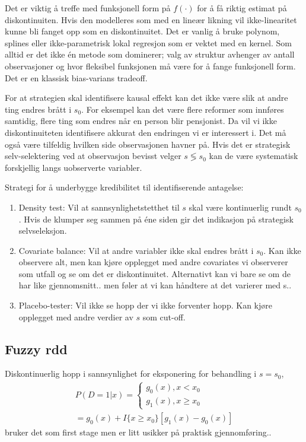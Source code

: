 Det er viktig å treffe med funksjonell form på $f(\cdot)$ for å få riktig estimat på diskontinuiten. Hvis den modelleres som med en lineær likning vil ikke-linearitet kunne bli fanget opp som en diskontinuitet. Det er vanlig å bruke polynom, splines eller ikke-parametrisk lokal regresjon som er vektet med en kernel. Som alltid er det ikke én metode som dominerer; valg av struktur avhenger av antall observasjoner og hvor fleksibel funksjonen må være for å fange funksjonell form. Det er en klassisk bias-varians tradeoff.  

For at strategien skal identifisere kausal effekt kan det ikke være slik at andre ting endres brått i $s_0$. For eksempel kan det være flere reformer som innføres samtidig, flere ting som endres når en person blir pensjonist. Da vil vi ikke diskontinuiteten identifisere akkurat den endringen vi er interessert i. Det må også være tilfeldig hvilken side observasjonen havner på. Hvis det er strategisk selv-selektering ved at observasjon bevisst velger $ s \lessgtr s_0$ kan de være systematisk forskjellig langs uobserverte variabler.

Strategi for å underbygge kredibilitet til identifiserende antagelse:
\begin{enumerate}
\item Density test: Vil at sannsynlighetstetthet til $s$ skal være kontinuerlig rundt $s_0$. Hvis de klumper seg sammen på éne siden gir det indikasjon på strategisk selvseleksjon.
\item Covariate balance: Vil at andre variabler ikke skal endres brått i $s_0$. Kan ikke observere alt, men kan kjøre opplegget med andre covariates vi observerer som utfall og se om det er diskontinuitet. Alternativt kan vi bare se om de har like gjennomsnitt.. men føler at vi kan håndtere at det varierer med s..
\item Placebo-tester: Vil ikke se hopp der vi ikke forventer hopp. Kan kjøre opplegget med andre verdier av $s$ som cut-off. 
\end{enumerate}
\subsection{Fuzzy rdd}
Diskontinuerlig hopp i sannsynlighet for eksponering for behandling i $s=s_0$, 
\begin{align}
P(D=1|x) = 
\begin{cases} g_0(x), x < x_0 \\
g_1(x), x \geq x_0
\end{cases} \\
= g_0(x) + I\{x \geq x_0\}[g_1(x)-g_0(x)] 
\end{align}
bruker det som first stage men er litt usikker på praktisk gjennomføring..
